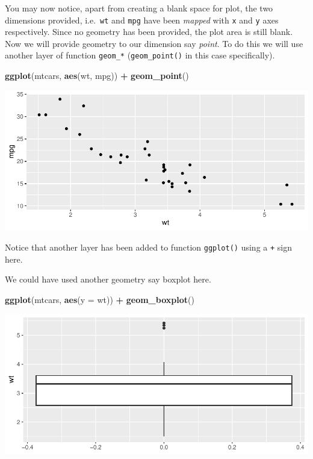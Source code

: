 \documentclass[
]{book}
\newenvironment{Shaded}{\begin{snugshade}}{\end{snugshade}}
\newcommand{\AttributeTok}[1]{\textcolor[rgb]{0.13,0.29,0.53}{#1}}
\newcommand{\FunctionTok}[1]{\textcolor[rgb]{0.13,0.29,0.53}{\textbf{#1}}}
\newcommand{\NormalTok}[1]{#1}
\newcommand{\SpecialCharTok}[1]{\textcolor[rgb]{0.81,0.36,0.00}{\textbf{#1}}}
\begin{document}
You may now notice, apart from creating a blank space for plot, the two dimensions provided, i.e.~\texttt{wt} and \texttt{mpg} have been \emph{mapped} with \texttt{x} and \texttt{y} axes respectively. Since no geometry has been provided, the plot area is still blank. Now we will provide geometry to our dimension say \emph{point}. To do this we will use another layer of function \texttt{geom\_*} (\texttt{geom\_point()} in this case specifically).

\begin{Shaded}
\begin{Highlighting}[]
\FunctionTok{ggplot}\NormalTok{(mtcars, }\FunctionTok{aes}\NormalTok{(wt, mpg)) }\SpecialCharTok{+}
  \FunctionTok{geom\_point}\NormalTok{()}
\end{Highlighting}
\end{Shaded}

\begin{center}\includegraphics{DauR_files/figure-latex/fig_3-1} \end{center}

Notice that another layer has been added to function \texttt{ggplot()} using a \texttt{+} sign here.

We could have used another geometry say boxplot here.

\begin{Shaded}
\begin{Highlighting}[]
\FunctionTok{ggplot}\NormalTok{(mtcars, }\FunctionTok{aes}\NormalTok{(}\AttributeTok{y =}\NormalTok{ wt)) }\SpecialCharTok{+}
  \FunctionTok{geom\_boxplot}\NormalTok{()}
\end{Highlighting}
\end{Shaded}

\begin{center}\includegraphics{DauR_files/figure-latex/fig_4-1} \end{center}
\end{document}
